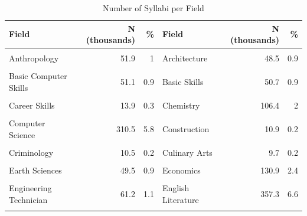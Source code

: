 \documentclass[
  12pt,
]{article}
\begin{document}
\begin{table}[!h]
\centering
\caption{\label{tab:SI-fields}Number of Syllabi per Field}
\centering
\fontsize{10}{12}\selectfont
\begin{tabular}[t]{lrrlrr}
\toprule
Field & N (thousands) & \% & Field & N (thousands) & \%\\
\midrule
\cellcolor{gray!10}{Accounting} & \cellcolor{gray!10}{76.9} & \cellcolor{gray!10}{1.4} & \cellcolor{gray!10}{Agriculture} & \cellcolor{gray!10}{36.2} & \cellcolor{gray!10}{0.7}\\
Anthropology & 51.9 & 1 & Architecture & 48.5 & 0.9\\
\cellcolor{gray!10}{Astronomy} & \cellcolor{gray!10}{13.9} & \cellcolor{gray!10}{0.3} & \cellcolor{gray!10}{Atmospheric Sciences} & \cellcolor{gray!10}{6.6} & \cellcolor{gray!10}{0.1}\\
Basic Computer Skills & 51.1 & 0.9 & Basic Skills & 50.7 & 0.9\\
\cellcolor{gray!10}{Biology} & \cellcolor{gray!10}{250.3} & \cellcolor{gray!10}{4.7} & \cellcolor{gray!10}{Business} & \cellcolor{gray!10}{450.4} & \cellcolor{gray!10}{8.4}\\
Career Skills & 13.9 & 0.3 & Chemistry & 106.4 & 2\\
\cellcolor{gray!10}{Chinese} & \cellcolor{gray!10}{10.6} & \cellcolor{gray!10}{0.2} & \cellcolor{gray!10}{Classics} & \cellcolor{gray!10}{23.3} & \cellcolor{gray!10}{0.4}\\
Computer Science & 310.5 & 5.8 & Construction & 10.9 & 0.2\\
\cellcolor{gray!10}{Cosmetology} & \cellcolor{gray!10}{6.9} & \cellcolor{gray!10}{0.1} & \cellcolor{gray!10}{Criminal Justice} & \cellcolor{gray!10}{45.5} & \cellcolor{gray!10}{0.8}\\
Criminology & 10.5 & 0.2 & Culinary Arts & 9.7 & 0.2\\
\cellcolor{gray!10}{Dance} & \cellcolor{gray!10}{14.2} & \cellcolor{gray!10}{0.3} & \cellcolor{gray!10}{Dentistry} & \cellcolor{gray!10}{13.9} & \cellcolor{gray!10}{0.3}\\
Earth Sciences & 49.5 & 0.9 & Economics & 130.9 & 2.4\\
\cellcolor{gray!10}{Education} & \cellcolor{gray!10}{240.3} & \cellcolor{gray!10}{4.5} & \cellcolor{gray!10}{Engineering} & \cellcolor{gray!10}{215.1} & \cellcolor{gray!10}{4}\\
Engineering Technician & 61.2 & 1.1 & English Literature & 357.3 & 6.6\\
\cellcolor{gray!10}{Film and Photography} & \cellcolor{gray!10}{49.8} & \cellcolor{gray!10}{0.9} & \cellcolor{gray!10}{Fine Arts} & \cellcolor{gray!10}{112.4} & \cellcolor{gray!10}{2.1}\\

\end{tabular}
\end{table}
\end{document}
